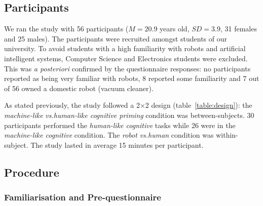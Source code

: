 \documentclass[lettersize, noapacite, twoside, HRI]{apa_HRI}
\newcommand{\vs}{\textit{vs.}\xspace}
\begin{document}
%
%
%
%

\subsection{Participants}

We ran the study with 56 participants ($M = 20.9$ years old, $SD = 3.9$, 31 females and
25 males).  The participants were recruited amongst students of our university.
To avoid students with a high familiarity with robots and artificial intelligent
systems, Computer Science and Electronics students were excluded. This was
\textit{a posteriori} confirmed by the questionnaire responses: no participants
reported as being very familiar with robots, 8 reported some familiarity
and 7 out of 56 owned a domestic robot (vacuum cleaner).

As stated previously, the study followed a 2$\times$2 design
(table~\ref{table:design}): the \emph{machine-like} \vs \emph{human-like
cognitive priming} condition was between-subjects. 30 participants performed the
\emph{human-like cognitive} tasks while 26 were in the \emph{machine-like
cognitive} condition. The \emph{robot} \vs \emph{human} condition was
within-subject. The study lasted in average 15 minutes per participant.

\subsection{Procedure}

\subsubsection{Familiarisation and Pre-questionnaire}
\end{document}
